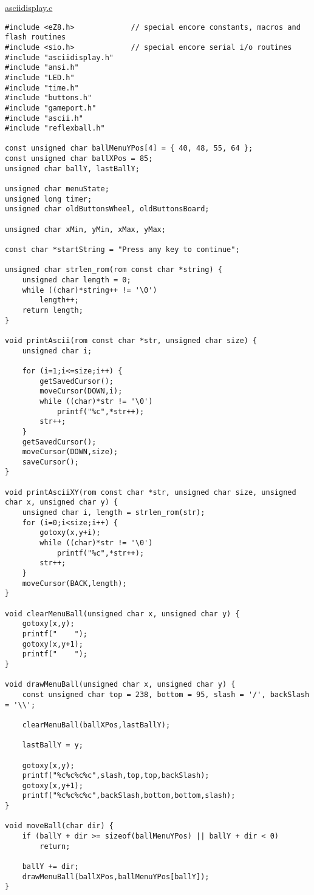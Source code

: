 \underline{asciidisplay.c}
\begin{lstlisting}
#include <eZ8.h>             // special encore constants, macros and flash routines
#include <sio.h>             // special encore serial i/o routines
#include "asciidisplay.h"
#include "ansi.h"
#include "LED.h"
#include "time.h"
#include "buttons.h"
#include "gameport.h"
#include "ascii.h"
#include "reflexball.h"

const unsigned char ballMenuYPos[4] = { 40, 48, 55, 64 };
const unsigned char ballXPos = 85;
unsigned char ballY, lastBallY;

unsigned char menuState;
unsigned long timer;
unsigned char oldButtonsWheel, oldButtonsBoard;

unsigned char xMin, yMin, xMax, yMax;

const char *startString = "Press any key to continue";

unsigned char strlen_rom(rom const char *string) {
	unsigned char length = 0;
	while ((char)*string++ != '\0')
		length++;
	return length;
}

void printAscii(rom const char *str, unsigned char size) {	
	unsigned char i;

	for (i=1;i<=size;i++) {
		getSavedCursor();
		moveCursor(DOWN,i);
		while ((char)*str != '\0')
			printf("%c",*str++);
		str++;		
	}
	getSavedCursor();
	moveCursor(DOWN,size);
	saveCursor();
}

void printAsciiXY(rom const char *str, unsigned char size, unsigned char x, unsigned char y) {
	unsigned char i, length = strlen_rom(str);	
	for (i=0;i<size;i++) {
		gotoxy(x,y+i);
		while ((char)*str != '\0')
			printf("%c",*str++);
		str++;
	}
	moveCursor(BACK,length);
}

void clearMenuBall(unsigned char x, unsigned char y) {
	gotoxy(x,y);
	printf("    ");
	gotoxy(x,y+1);
	printf("    ");
}

void drawMenuBall(unsigned char x, unsigned char y) {
	const unsigned char top = 238, bottom = 95, slash = '/', backSlash = '\\';

	clearMenuBall(ballXPos,lastBallY);

	lastBallY = y;

	gotoxy(x,y);
	printf("%c%c%c%c",slash,top,top,backSlash);
	gotoxy(x,y+1);
	printf("%c%c%c%c",backSlash,bottom,bottom,slash);
}

void moveBall(char dir) {	
	if (ballY + dir >= sizeof(ballMenuYPos) || ballY + dir < 0)
		return;

	ballY += dir;
	drawMenuBall(ballXPos,ballMenuYPos[ballY]);
}


\end{lstlisting}
